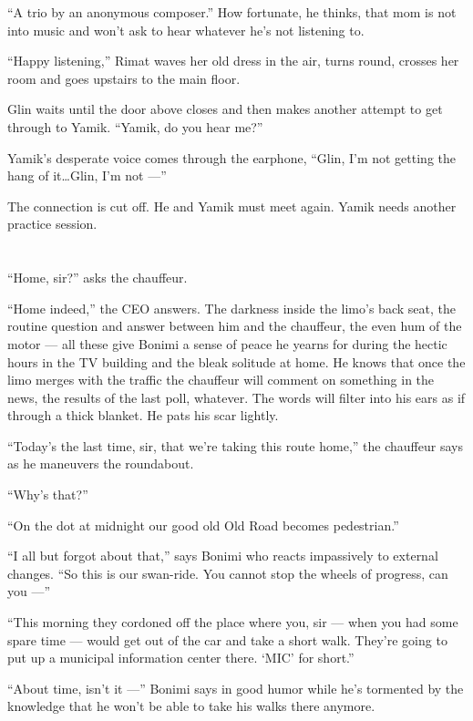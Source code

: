 \documentclass[twoside,11pt,openany]{book}
\begin{document}
``A trio by an anonymous composer.'' How fortunate, he thinks, that mom is not into music and
won't ask to hear whatever he's  not listening to.

``Happy listening,'' Rimat waves her old dress in the air, turns round, crosses her room and
goes upstairs to the main floor.

Glin waits until the door above closes and then makes another attempt to get through to Yamik. ``Yamik, do
you hear me?''

Yamik's desperate voice comes through the earphone,
``Glin, I'm not getting the hang of it{\ldots}Glin, I'm not ---''

The connection is cut off. He and Yamik must meet again. Yamik needs another practice session.



\chapter{}

``Home, sir?'' asks the chauffeur.

``Home indeed,'' the CEO answers. The darkness inside{ }the limo's back seat,
the routine question and answer between him and the chauffeur, the even hum of the motor --- all these give Bonimi a
sense of peace he yearns for during the hectic hours in the TV building and the{ }bleak solitude 
at home. He knows that once the limo merges with the traffic the chauffeur will comment on something in the news, the
results of the last poll, whatever.  The words will filter into his ears as if through a thick blanket. He pats his
scar lightly.

``Today's the last time, sir, that we're taking this route home,'' the chauffeur says as he
maneuvers the roundabout.

``Why's that?''

``On the dot at midnight our good old Old Road becomes pedestrian.''

``I all but forgot about that,'' says Bonimi who reacts impassively to external changes.
``So this is our swan-ride. You cannot stop the wheels of progress, can you ---''

``This morning they cordoned off the place where you, sir --- when you had some spare time --- would get out of
the car and take a short walk. They're going to put up a municipal information center there. `MIC' for
short.''

``About time, isn't it ---'' Bonimi says in good humor while he's tormented by the knowledge that he won't
be able to take his walks there anymore. { }
\end{document}
